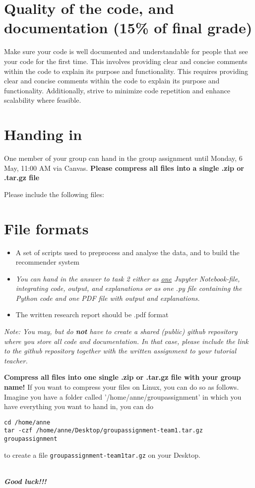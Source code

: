 \section{Quality of the code, and documentation (15\% of final grade)}

Make sure your code is well documented and understandable for people that see your code for the first time. This involves providing clear and concise comments within the code to explain its purpose and functionality.
This requires providing clear and concise comments within the code to explain its purpose and functionality. Additionally, strive to minimize code repetition and enhance scalability where feasible.


\section{Handing in}
One member of your group can hand in the group assignment until Monday, 6 May, 11:00 AM via Canvas. \textbf{Please compress all files into a single .zip or .tar.gz file} 

Please include the following files:   
\section*{File formats}

\begin{itemize}
	\item  A set of scripts used to preprocess and analyse the data, and to build the recommender system
	\item \emph{
		You can hand in the answer to task 2 \emph{either} as \underline{one} Jupyter Notebook-file, integrating code, output, and explanations \emph{or} as one .py file containing the Python code and one PDF file with output and explanations.
	}
	\item The written research report should be .pdf format
\end{itemize}

\emph{Note: You may, but do \textbf{not} have to create a shared (public) github repository where you store all code and documentation. In that case, please include the link to the github repository together with the written assignment to your tutorial teacher.}

\textbf{Compress all files into one single .zip or .tar.gz file with your group name!}
If you want to compress your files on Linux, you can do so as follows. Imagine you have a folder called '/home/anne/groupassignment' in which you have everything you want to hand in, you can do

\begin{lstlisting}
cd /home/anne
tar -czf /home/anne/Desktop/groupassignment-team1.tar.gz groupassignment
\end{lstlisting}
to create a file \texttt{groupassignment-team1tar.gz} on your Desktop.


~\\
\textbf{\emph{Good luck!!!}}
